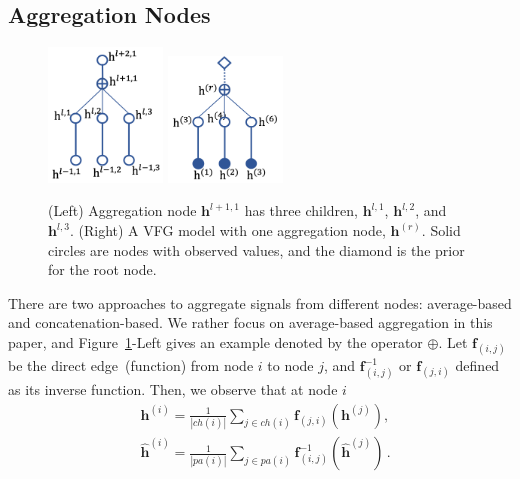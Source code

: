 \documentclass{article}
\begin{document}
\subsection{ Aggregation Nodes}\label{sec:node_aggr}
\begin{figure}
\vspace{-0.3in}
\begin{center}
 \includegraphics[width=1.2in]{fig/aggre_node.png}
  \includegraphics[width=1.2in]{fig/aggre_model.png}
\end{center}
   \caption{(Left) Aggregation node $\mathbf{h}^{l+1,1}$ has three children, $\mathbf{h}^{l,1}$, $\mathbf{h}^{l,2}$, and $\mathbf{h}^{l,3}$. (Right) A VFG model with one aggregation node, $\mathbf{h}^{(r)}$. Solid circles are nodes with observed values, and the diamond is the prior for the root node.}
\label{fig:node_aggre}
\vspace{-0.6in}
\end{figure}
\vspace{-0.05in}
 There are two approaches to aggregate signals from different nodes: average-based and concatenation-based. We rather focus on average-based aggregation in this paper,  and Figure~\ref{fig:node_aggre}-Left gives  an example denoted by the operator $\oplus$. 
Let $\mathbf{f}_{(i, j)}$ be the direct edge~(function) from node $i$ to node $j$, and $\mathbf{f}^{-1}_{ (i, j)}$ or  $\mathbf{f}_{ (j, i)}$ defined as its inverse function. Then, we observe that at node $i$
 \begin{align*}
&  \mathbf{h}^{(i)} = \frac{1}{|ch(i)|} \sum_{j \in ch(i) } \mathbf{f}_{(j,i)}(\mathbf{h}^{(j)})  , \\ &\widehat{\mathbf{h}}^{(i)} = \frac{1}{|pa(i)|} \sum_{j \in pa(i) } \mathbf{f}^{-1}_{ (i,j)}(\widehat{\mathbf{h}}^{(j)}) \, .
\end{align*}%
\end{document}
